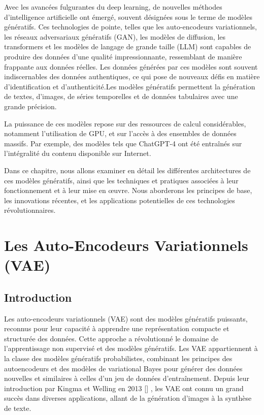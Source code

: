 Avec les avancées fulgurantes du deep learning, de nouvelles méthodes
d'intelligence artificielle ont émergé, souvent désignées sous le terme de
modèles génératifs. Ces technologies de pointe, telles que les auto-encodeurs
variationnels, les réseaux adversariaux génératifs (GAN), les modèles de
diffusion, les transformers et les modèles de langage de grande taille (LLM)
sont capables de produire des données d'une qualité impressionnante,
ressemblant de manière frappante aux données réelles. Les données générées par
ces modèles sont souvent indiscernables des données authentiques, ce qui pose
de nouveaux défis en matière d'identification et d'authenticité.Les modèles
génératifs permettent la génération de textes, d'images, de séries temporelles
et de données tabulaires avec une grande précision.

\medskip

La puissance de ces modèles repose sur des ressources de calcul considérables,
notamment l'utilisation de GPU, et sur l'accès à des ensembles de données
massifs. Par exemple, des modèles tels que ChatGPT-4 ont été entraînés sur
l'intégralité du contenu disponible sur Internet.

\medskip

Dans ce chapitre, nous allons examiner en détail les différentes architectures
de ces modèles génératifs, ainsi que les techniques et pratiques associées à
leur fonctionnement et à leur mise en œuvre. Nous aborderons les principes de
base, les innovations récentes, et les applications potentielles de ces
technologies révolutionnaires.



\section{Les Auto-Encodeurs Variationnels (VAE)}
\subsection{Introduction}

Les auto-encodeurs variationnels (VAE) sont des modèles génératifs puissants, reconnus pour leur capacité à
apprendre une représentation compacte et structurée des données. Cette approche a révolutionné le domaine de
l'apprentissage non supervisé et des modèles génératifs. Les VAE appartiennent à la classe des modèles génératifs
probabilistes, combinant les principes des autoencodeurs et des modèles de variational Bayes pour générer des 
données nouvelles et similaires à celles d'un jeu de données d'entraînement. 
Depuis leur introduction par Kingma et Welling en 2013 [\cite{kingma_welling_auto_encoding}] , les VAE ont connu un grand succès dans diverses applications, allant de la génération d'images à la synthèse de texte.



